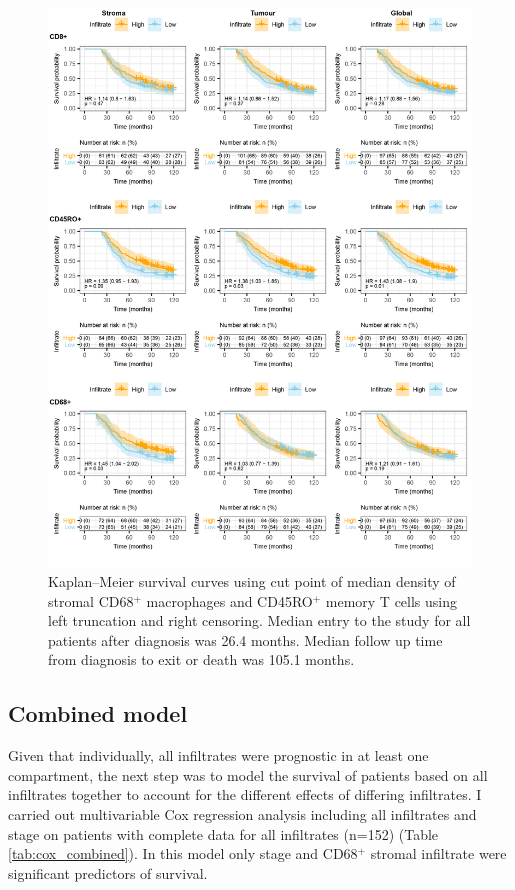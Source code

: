 \begin{figure}
    \centering
    \includegraphics{Chapter2/Figs/Raster/KM_allinf.png}
    \caption[KM Survival curves for individual infiltrates]{Kaplan–Meier survival curves using cut point of median density of stromal CD68$^+$ macrophages and CD45RO$^+$ memory T cells using left truncation and right censoring. Median entry to the study for all patients after diagnosis was 26.4 months. Median follow up time from diagnosis to exit or death was 105.1 months.}
    \label{fig:KM_infiltrates}
\end{figure}


\subsection{Combined model}

Given that individually, all infiltrates were prognostic in at least one compartment, the next step was to model the survival of patients based on all infiltrates together to account for the different effects of differing infiltrates. I carried out multivariable Cox regression analysis including all infiltrates and stage on patients with complete data for all infiltrates (n=152) (Table \ref{tab:cox_combined}).  In this model only stage and CD68$^+$ stromal infiltrate were significant predictors of survival.

